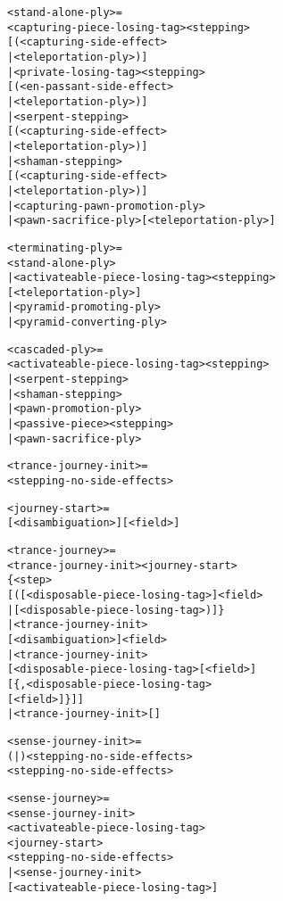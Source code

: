 \begin{alltt}
<stand-alone-ply> =
  <capturing-piece-losing-tag><stepping>
  [(<capturing-side-effect>
    | <teleportation-ply>)]
| <private-losing-tag><stepping>
  [(<en-passant-side-effect>
    | <teleportation-ply>)]
| <serpent-stepping>
  [(<capturing-side-effect>
    | <teleportation-ply>)]
| <shaman-stepping>
  [(<capturing-side-effect>
    | <teleportation-ply>)]
| <capturing-pawn-promotion-ply>
| <pawn-sacrifice-ply>[<teleportation-ply>]

<terminating-ply> =
  <stand-alone-ply>
| <activateable-piece-losing-tag><stepping>
  [<teleportation-ply>]
| <pyramid-promoting-ply>
| <pyramid-converting-ply>

<cascaded-ply> =
  <activateable-piece-losing-tag><stepping>
| <serpent-stepping>
| <shaman-stepping>
| <pawn-promotion-ply>
| <passive-piece><stepping>
| <pawn-sacrifice-ply>
\end{alltt}

\clearpage %

\begin{alltt}
<trance-journey-init> =
  <stepping-no-side-effects>

<journey-start> =
  [<disambiguation>][\alg{\textbackslash}<field>]

<trance-journey> =
  <trance-journey-init><journey-start>
  \{<step>
    [(\alg{<}[<disposable-piece-losing-tag>]<field>
      | \alg{*}[<disposable-piece-losing-tag>)]\}
| <trance-journey-init>
    [<disambiguation>]<field>
| <trance-journey-init>
  [<disposable-piece-losing-tag>[<field>]
    [\{,<disposable-piece-losing-tag>
      [<field>]\}]]
| <trance-journey-init>[]

<sense-journey-init> =
  (|)<stepping-no-side-effects>
  <stepping-no-side-effects>

<sense-journey> =
  <sense-journey-init>
  <activateable-piece-losing-tag>
  <journey-start>
  <stepping-no-side-effects>
| <sense-journey-init>
  [<activateable-piece-losing-tag>]
\end{alltt}

\clearpage %

